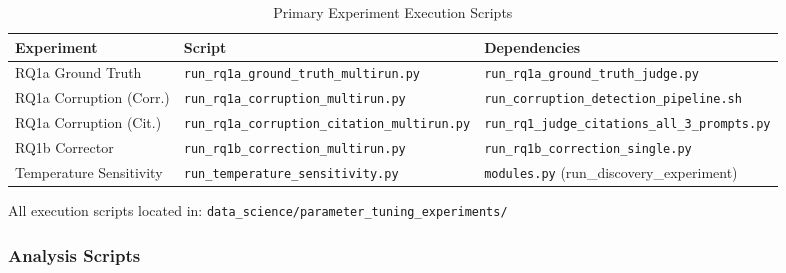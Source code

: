 \begin{table}[H]
\centering
\caption{Primary Experiment Execution Scripts}
\label{tab:exec_scripts}
\footnotesize
\begin{tabularx}{\textwidth}{@{}l X X@{}}
\toprule
\textbf{Experiment} & \textbf{Script} & \textbf{Dependencies} \\
\midrule
RQ1a Ground Truth & \texttt{run\_rq1a\_ground\_truth\_multirun.py} & \texttt{run\_rq1a\_ground\_truth\_judge.py} \\
RQ1a Corruption (Corr.) & \texttt{run\_rq1a\_corruption\_multirun.py} & \texttt{run\_corruption\_detection\_pipeline.sh} \\
RQ1a Corruption (Cit.) & \texttt{run\_rq1a\_corruption\_citation\_multirun.py} & \texttt{run\_rq1\_judge\_citations\_all\_3\_prompts.py} \\
RQ1b Corrector & \texttt{run\_rq1b\_correction\_multirun.py} & \texttt{run\_rq1b\_correction\_single.py} \\
Temperature Sensitivity & \texttt{run\_temperature\_sensitivity.py} & \texttt{modules.py} (run\_discovery\_experiment) \\
\bottomrule
\end{tabularx}
\end{table}

All execution scripts located in: \texttt{data\_science/parameter\_tuning\_experiments/}

\subsubsection{Analysis Scripts}

